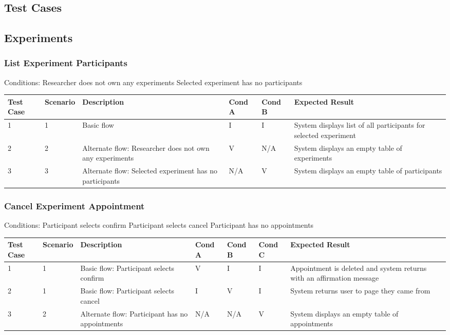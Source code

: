 \begin{landscape}
\section{Test Cases}
\subsection{Experiments}
\subsubsection{List Experiment Participants}
\begin{outline}[enumerate]
\1 [] Conditions:
\2 [A] Researcher does not own any experiments
\2 [B] Selected experiment has no participants
\end{outline}
\begin{table}[!h]
    \begin{tabular}{|l|l|p{3in}|l|l|p{3in}|}
        \hline
        Test Case & Scenario & Description & Cond A & Cond B & Expected Result \\ \hline
        1 & 1 & Basic flow & I & I & System displays list of all participants for selected experiment \\ \hline
        2 & 2 & Alternate flow: Researcher does not own any experiments & V & N/A & System displays an empty table of experiments \\ \hline
        3 & 3 & Alternate flow: Selected experiment has no participants & N/A & V & System displays an empty table of participants \\ \hline
    \end{tabular}
\end{table}

\subsubsection{Cancel Experiment Appointment}
\begin{outline}[enumerate]
\1 [] Conditions:
\2 [A] Participant selects confirm
\2 [B] Participant selects cancel
\2 [C] Participant has no appointments
\end{outline}
\begin{table}[!h]
    \begin{tabular}{|l|l|p{2.75in}|l|l|l|p{2.75in}|}
        \hline
        Test Case & Scenario & Description & Cond A & Cond B & Cond C & Expected Result \\ \hline
        1 & 1 & Basic flow: Participant selects confirm & V & I & I & Appointment is deleted and system returns with an affirmation message \\ \hline
        2 & 1 & Basic flow: Participant selects cancel & I & V & I & System returns user to page they came from \\ \hline
        3 & 2 & Alternate flow: Participant has no appointments & N/A & N/A & V & System displays an empty table of appointments \\ \hline
    \end{tabular}
\end{table}


\end{landscape}
